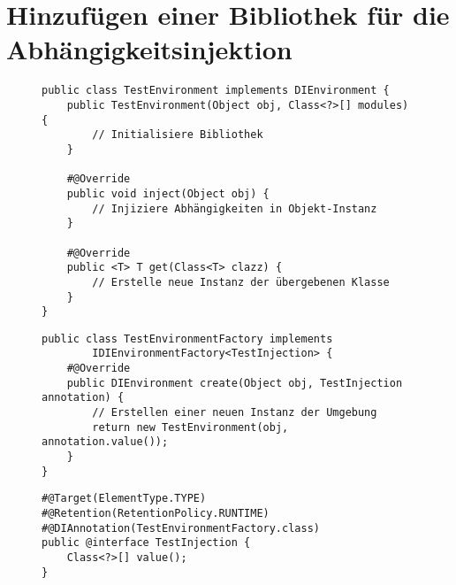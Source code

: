 \chapter{Hinzufügen einer Bibliothek für die Abhängigkeitsinjektion}
\label{appendix:add_new_di_library}
\begin{figure}[H]
	\begin{lstlisting}[caption=Beispiel -- Erstellen einer neuen Umgebung., captionpos=b, nolol]
public class TestEnvironment implements DIEnvironment {
	public TestEnvironment(Object obj, Class<?>[] modules) {
		// Initialisiere Bibliothek
	}

	#@Override
	public void inject(Object obj) {
		// Injiziere Abhängigkeiten in Objekt-Instanz
	}

	#@Override
	public <T> T get(Class<T> clazz) {
		// Erstelle neue Instanz der übergebenen Klasse
	}
}
	\end{lstlisting}
\end{figure}
\begin{figure}[H]
	\begin{lstlisting}[caption=Beispiel -- Erstellen einer neuen Umgebung., captionpos=b, nolol]
public class TestEnvironmentFactory implements 
		IDIEnvironmentFactory<TestInjection> {
	#@Override
	public DIEnvironment create(Object obj, TestInjection annotation) {
		// Erstellen einer neuen Instanz der Umgebung
		return new TestEnvironment(obj, annotation.value());
	}
}
	\end{lstlisting}
\end{figure}
\begin{figure}[H]
	\begin{lstlisting}[caption=Beispiel -- Erstellen einer neuen Annotation., captionpos=b, nolol]
#@Target(ElementType.TYPE)
#@Retention(RetentionPolicy.RUNTIME)
#@DIAnnotation(TestEnvironmentFactory.class)
public @interface TestInjection {
	Class<?>[] value();
}
	\end{lstlisting}
\end{figure}